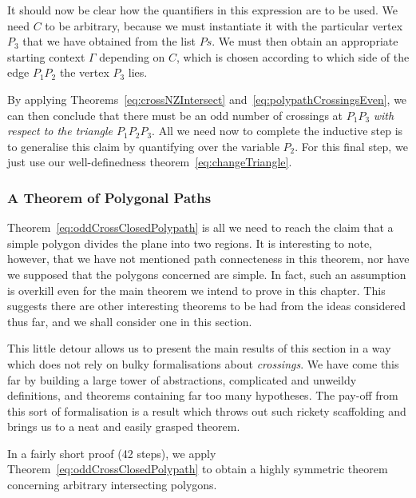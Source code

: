 It should now be clear how the quantifiers in this expression are to be used. We need $C$ to be arbitrary, because we must instantiate it with the particular vertex $P_3$ that we have obtained from the list $Ps$. We must then obtain an appropriate starting context $\Gamma$ depending on $C$, which is chosen according to which side of the edge $P_1P_2$ the vertex $P_3$ lies. 

By applying Theorems~\ref{eq:crossNZIntersect} and~\ref{eq:polypathCrossingsEven}, we can then conclude that there must be an odd number of crossings at $P_1P_3$ \emph{with respect to the triangle $P_1P_2P_3$}. All we need now to complete the inductive step is to generalise this claim by quantifying over the variable $P_2$. For this final step, we just use our well-definedness theorem~\eqref{eq:changeTriangle}.

\subsubsection{A Theorem of Polygonal Paths}
Theorem~\ref{eq:oddCrossClosedPolypath} is all we need to reach the claim that a simple polygon divides the plane into two regions. It is interesting to note, however, that we have not mentioned path connecteness in this theorem, nor have we supposed that the polygons concerned are simple. In fact, such an assumption is overkill even for the main theorem we intend to prove in this chapter. This suggests there are other interesting theorems to be had from the ideas considered thus far, and we shall consider one in this section.

This little detour allows us to present the main results of this section in a way which does not rely on bulky formalisations about \emph{crossings}. We have come this far by building a large tower of abstractions, complicated and unweildy definitions, and theorems containing far too many hypotheses. The pay-off from this sort of formalisation is a result which throws out such rickety scaffolding and brings us to a neat and easily grasped theorem.

In a fairly short proof (42 steps), we apply Theorem~\ref{eq:oddCrossClosedPolypath} to obtain a highly symmetric theorem concerning arbitrary intersecting polygons.

